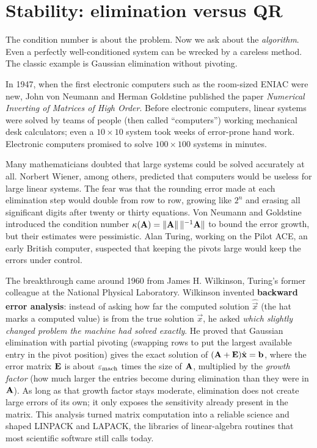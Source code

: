 \section{Stability: elimination versus QR}

The condition number is about the problem. Now we ask about the \emph{algorithm}. Even
a perfectly well-conditioned system can be wrecked by a careless method. The classic
example is Gaussian elimination without pivoting.

\begin{historybox}
In 1947, when the first electronic computers such as the room-sized ENIAC were new, John
von Neumann and Herman Goldstine published the paper \emph{Numerical Inverting of
Matrices of High Order}. Before electronic computers, linear systems were solved by teams
of people (then called ``computers'') working mechanical desk calculators; even a
$10 \times 10$ system took weeks of error-prone hand work. Electronic computers promised
to solve $100 \times 100$ systems in minutes.

Many mathematicians doubted that large systems could be solved accurately at all.
Norbert Wiener, among others, predicted that computers would be useless for large linear
systems. The fear was that the rounding error made at each elimination step would double
from row to row, growing like $2^n$ and erasing all significant digits after twenty or
thirty equations. Von Neumann and Goldstine introduced the condition number
$\kappa(\mathbf{A}) = \lVert\mathbf{A}\rVert\,\lVert^{-1}{\mathbf{A}}\rVert$ to bound the error growth, but
their estimates were pessimistic. Alan Turing, working on the Pilot ACE, an early British
computer, suspected that keeping the pivots large would keep the errors under control.

The breakthrough came around 1960 from James H. Wilkinson, Turing's former colleague at
the National Physical Laboratory. Wilkinson invented \textbf{backward error analysis}:
instead of asking how far the computed solution $\hat{\vec{x}}$ (the hat marks a computed
value) is from the true solution $\vec{x}$, he asked \emph{which slightly changed problem
the machine had solved exactly}. He proved that Gaussian elimination with partial
pivoting (swapping rows to put the largest available entry in the pivot position) gives
the exact solution of $(\mathbf{A} + \mathbf{E})\hat{\mathbf{x}} = \mathbf{b}$, where the error matrix
$\mathbf{E}$ is about $\varepsilon_{\text{mach}}$ times the size of $\mathbf{A}$, multiplied by the
\emph{growth factor} (how much larger the entries become during elimination than they
were in $\mathbf{A}$). As long as that growth factor stays moderate, elimination does not
create large errors of its own; it only exposes the sensitivity already present in the
matrix. This analysis turned matrix computation into a reliable science and shaped
LINPACK and LAPACK, the libraries of linear-algebra routines that most scientific
software still calls today.


\end{historybox}
